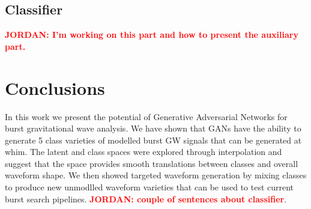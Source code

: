 \documentclass[12pt]{iopart}
\newcommand{\jordan}[1]{\textbf{\textcolor{red}{JORDAN: #1}}}
\begin{document}

\subsection{Classifier}
\jordan{I'm working on this part and how to present the auxiliary part.}


\section{Conclusions}
In this work we present the potential of Generative Adversarial Networks for burst gravitational wave analysis. We have shown that GANs have the ability to generate 5 class varieties of modelled burst \ac{GW} signals that can be generated at whim. The latent and class spaces were explored through interpolation and suggest that the space provides smooth translations between classes and overall waveform shape. We then showed targeted waveform generation by mixing classes to produce new unmodlled waveform varieties that can be used to test current burst search pipelines. \jordan{couple of sentences about classifier}. 
\end{document}
